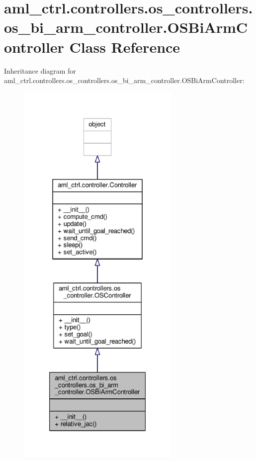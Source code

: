 \hypertarget{classaml__ctrl_1_1controllers_1_1os__controllers_1_1os__bi__arm__controller_1_1_o_s_bi_arm_controller}{\section{aml\-\_\-ctrl.\-controllers.\-os\-\_\-controllers.\-os\-\_\-bi\-\_\-arm\-\_\-controller.\-O\-S\-Bi\-Arm\-Controller Class Reference}
\label{classaml__ctrl_1_1controllers_1_1os__controllers_1_1os__bi__arm__controller_1_1_o_s_bi_arm_controller}
}


Inheritance diagram for aml\-\_\-ctrl.\-controllers.\-os\-\_\-controllers.\-os\-\_\-bi\-\_\-arm\-\_\-controller.\-O\-S\-Bi\-Arm\-Controller\-:\nopagebreak
\begin{figure}[H]
\begin{center}
\leavevmode
\includegraphics[height=550pt]{classaml__ctrl_1_1controllers_1_1os__controllers_1_1os__bi__arm__controller_1_1_o_s_bi_arm_controller__inherit__graph}
\end{center}
\end{figure}


